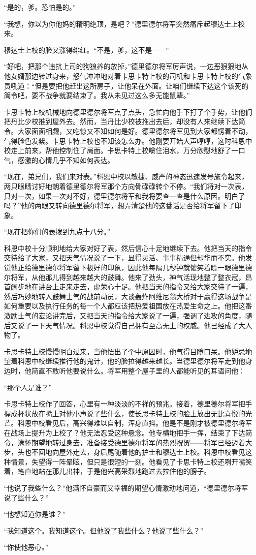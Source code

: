     “是的，爹。恐怕是的。”

    “我想，你以为你他妈的精明绝顶，是吧？”德里德尔将军突然痛斥起穆达士上校来。

    穆达士上校的脸又涨得绯红。“不是，爹，这不是——”

    “好吧，把那个违抗上司的狗狼养的放掉，”德里德尔将军厉声说，一边恶狠狠地从他女婿那边转过身来，怒气冲冲地对着卡思卡特上校的司机和卡思卡特上校的气象员吼道：“但是要把他赶出这所房子，让他呆在外面。让咱们继续下达这个该死的简令吧，要不战争就要结束了。我从未见过这么多无能鼠辈。”

    卡思卡特上校机械地向德里德尔将军点了点头，急忙向他手下打了个手势，让他们把丹比少校推到屋外去。然而，当丹比少校被推出去后，却没有人来继续下达简令。大家面面相觑，又吃惊又不知如何是好。德里德尔将军见到大家都愣着不动，气得脸色发紫。卡思卡特上校也不知该怎么办。他刚要开始大声哼哼，这时科恩中校走上前来，帮他控制住了局面。卡思卡特上校噙住泪水，万分欣慰地舒了一口气，感激的心情几乎不知如何表达。

    “现在，弟兄们，我们来对表。”科恩中校以敏捷、威严的神态迅速发号施令起来，两只眼睛讨好地朝着德里德尔将军那个方向骨碌碌转个不停。“我们将对一次表，只对一次，如果一次对不好，德里德尔将军和我将要查一查是什么原因。明白了吗？”他的两眼又转向德里德尔将军，想弄清楚他的这番话是否给将军留下了印象。

    “现在把你们的表拨到九点十八分。”

    科恩中校十分顺利地给大家对好了表，然后信心十足地继续下去。他把当天的指令交待给了大家，又把天气情况说了一下，显得灵活、事事精通但却华而不实。他发觉他正给德里德尔将军留下极好的印象，因此他每隔几秒钟就傻笑着瞟一眼德里德尔将军，从他那儿得到越来越大的鼓舞。他来了劲头，神气活现地整了整衣冠，昂首阔步地在讲台上走来走去，虚荣心十足。他把当天的指令又给大家交待了一遍，然后巧妙地转入鼓舞士气的战前动员，大谈轰炸阿维尼翁大桥对于赢得这场战争是如何重要以及执行任务的每一个人都应该把热爱祖国放在热爱生命之上。他把这番激励士气的宏论讲完后，又把当天的指令给大家说了一遍，强调了进攻的角度，随后又说了一下天气情况。科恩中校觉得自己拥有至高无上的权威。他已经成了大人物了。

    卡思卡特上校慢慢明白过来，当他悟出了个中原因时，他气得目瞪口呆。他妒忌地望着科恩中校继续推行他的鬼计，他的脸拉得越来越长。当德里德尔将军走到他身边时，他简直不敢听他要说什么。将军用整个屋子里的人都能听见的耳语问他：

    “那个人是谁？”

    卡思卡特上校作了回答，心里有一种淡淡的不祥的预兆。接着，德里德尔将军把手握成杯状放在嘴上对他小声说了些什么，使长思卡特上校的脸上放出无比喜悦的光芒。科恩中校看见后，高兴得难以自制，浑身直抖。他是不是刚才被德里德尔将军在战场上提升为上校了？他无法忍受这种悬念。他专横地把手一挥，结束了下达简令，满怀期望地转过身去，准备接受德里德尔将军的热烈祝贺——将军已经迈着大步，头也不回地向屋外走去，身后尾随着他的护士和穆达士上校。科恩中校看见这种情景，失望得一阵晕眩，但只是很短的一刻。他看见了卡思卡特上校还咧开嘴笑着，笔直地站在那儿出神，于是他兴高采烈地跑过去拉住他的膀子。

    “他说了我些什么？”他满怀自豪而又幸福的期望心情激动地问道，“德里德尔将军说了些什么？”

    “他想知道你是谁？”

    “我知道这个。我知道这个。但他说了我些什么？他说了些什么？”

    “你使他恶心。”
